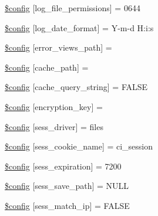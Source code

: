 \begin{DoxyCompactItemize}
\mbox{\hyperlink{application_2config_2config_8php_a2f0158b0ecb2c39e093957526953346a}{\$config}} \mbox{[}\textquotesingle{}log\+\_\+file\+\_\+permissions\textquotesingle{}\mbox{]} = 0644
\item 
\mbox{\hyperlink{application_2config_2config_8php_ae9f524e834e4d05f0e30aed5edb33e2c}{\$config}} \mbox{[}\textquotesingle{}log\+\_\+date\+\_\+format\textquotesingle{}\mbox{]} = \textquotesingle{}Y-\/m-\/d H\+:i\+:s\textquotesingle{}
\item 
\mbox{\hyperlink{application_2config_2config_8php_a7c49f60eb08b8ebddb5e5af1d02b2b72}{\$config}} \mbox{[}\textquotesingle{}error\+\_\+views\+\_\+path\textquotesingle{}\mbox{]} = \textquotesingle{}\textquotesingle{}
\item 
\mbox{\hyperlink{application_2config_2config_8php_a0f1391e01a3a0b76f22e6c0b5c0f47af}{\$config}} \mbox{[}\textquotesingle{}cache\+\_\+path\textquotesingle{}\mbox{]} = \textquotesingle{}\textquotesingle{}
\item 
\mbox{\hyperlink{application_2config_2config_8php_a70f4af0a439597d3d7f8be31a050867e}{\$config}} \mbox{[}\textquotesingle{}cache\+\_\+query\+\_\+string\textquotesingle{}\mbox{]} = F\+A\+L\+SE
\item 
\mbox{\hyperlink{application_2config_2config_8php_af43facf6a8ff007843b771513aa93dfe}{\$config}} \mbox{[}\textquotesingle{}encryption\+\_\+key\textquotesingle{}\mbox{]} = \textquotesingle{}\textquotesingle{}
\item 
\mbox{\hyperlink{application_2config_2config_8php_aaeca65cee3c00f9df76c74e352283c3c}{\$config}} \mbox{[}\textquotesingle{}sess\+\_\+driver\textquotesingle{}\mbox{]} = \textquotesingle{}files\textquotesingle{}
\item 
\mbox{\hyperlink{application_2config_2config_8php_a416e16954fea70dd96e9ff2134451b87}{\$config}} \mbox{[}\textquotesingle{}sess\+\_\+cookie\+\_\+name\textquotesingle{}\mbox{]} = \textquotesingle{}ci\+\_\+session\textquotesingle{}
\item 
\mbox{\hyperlink{application_2config_2config_8php_a233a1bb9ff2f169ef3cfa142121a25f7}{\$config}} \mbox{[}\textquotesingle{}sess\+\_\+expiration\textquotesingle{}\mbox{]} = 7200
\item 
\mbox{\hyperlink{application_2config_2config_8php_a3d653cf8ae8e24c6a336796f7447ccad}{\$config}} \mbox{[}\textquotesingle{}sess\+\_\+save\+\_\+path\textquotesingle{}\mbox{]} = N\+U\+LL
\item 
\mbox{\hyperlink{application_2config_2config_8php_ad61d051008d3524d24ba135bfeb1531f}{\$config}} \mbox{[}\textquotesingle{}sess\+\_\+match\+\_\+ip\textquotesingle{}\mbox{]} = F\+A\+L\+SE

\end{DoxyCompactItemize}
